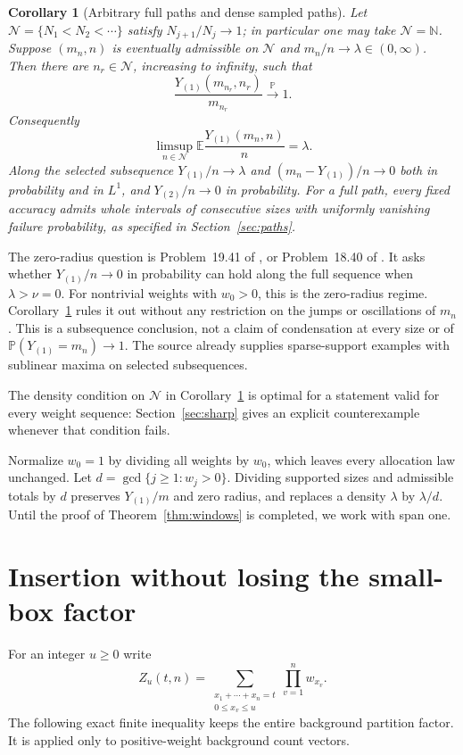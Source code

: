 \documentclass[11pt]{amsart}
\newtheorem{corollary}[theorem]{Corollary}
\theoremstyle{remark}\newtheorem{remark}[theorem]{Remark}
\newcommand{\Pp}{\mathbb P}
\newcommand{\E}{\mathbb E}
\newcommand{\N}{\mathbb N}
\begin{document}
\begin{corollary}[Arbitrary full paths and dense sampled paths]\label{cor:paths}
Let $\mathcal N=\{N_1<N_2<\cdots\}$ satisfy $N_{j+1}/N_j\to1$; in particular
one may take $\mathcal N=\N$. Suppose $(m_n,n)$ is eventually admissible on
$\mathcal N$ and $m_n/n\to\lambda\in(0,\infty)$. Then there are
$n_r\in\mathcal N$, increasing to infinity, such that
\begin{equation}\label{eq:conclusion}
 \frac{Y_{(1)}(m_{n_r},n_r)}{m_{n_r}}\xrightarrow{\Pp}1.
\end{equation}
Consequently
\[
 \limsup_{n\in\mathcal N}\E\frac{Y_{(1)}(m_n,n)}n=\lambda.
\]
Along the selected subsequence $Y_{(1)}/n\to\lambda$ and
$(m_n-Y_{(1)})/n\to0$ both in probability and in $L^1$, and
$Y_{(2)}/n\to0$ in probability. For a full path, every fixed accuracy admits
whole intervals of consecutive sizes with uniformly vanishing failure
probability, as specified in Section~\ref{sec:paths}.
\end{corollary}

The zero-radius question is Problem~19.41 of \cite{Janson}, or
Problem~18.40 of \cite{JansonPreprint}. It asks whether $Y_{(1)}/n\to0$ in
probability can hold along the full sequence when $\lambda>\nu=0$.
For nontrivial weights with $w_0>0$, this is the zero-radius regime. Corollary~\ref{cor:paths} rules it
out without any restriction on the jumps or oscillations of $m_n$. This
is a subsequence conclusion, not a claim of condensation at every size or
of $\Pp(Y_{(1)}=m_n)\to1$. The source already supplies sparse-support
examples with sublinear maxima on selected subsequences.

The density condition on $\mathcal N$ in Corollary~\ref{cor:paths} is optimal
for a statement valid for every weight sequence: Section~\ref{sec:sharp}
gives an explicit counterexample whenever that condition fails.

Normalize $w_0=1$ by dividing all weights by $w_0$, which leaves every
allocation law unchanged. Let $d=\gcd\{j\ge1:w_j>0\}$. Dividing supported
sizes and admissible totals by $d$ preserves $Y_{(1)}/m$ and zero radius,
and replaces a density $\lambda$ by $\lambda/d$. Until the proof of
Theorem~\ref{thm:windows} is completed, we work with span one.

\section{Insertion without losing the small-box factor}\label{sec:insertion}
For an integer $u\ge0$ write
\[
 Z_u(t,n)=\sum_{\substack{x_1+\cdots+x_n=t\\0\le x_v\le u}}
             \prod_{v=1}^n w_{x_v}.
\]
The following exact finite inequality keeps the entire background partition
factor. It is applied only to positive-weight background count vectors.
\end{document}
